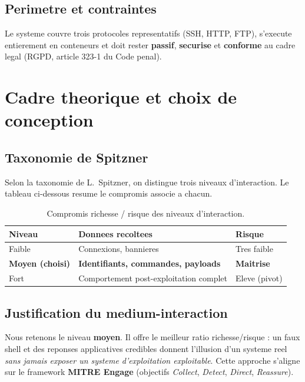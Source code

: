 \documentclass[11pt,a4paper]{article}
\begin{document}
\subsection{Perimetre et contraintes}
Le systeme couvre trois protocoles representatifs (SSH, HTTP, FTP), s'execute
entierement en conteneurs et doit rester \textbf{passif}, \textbf{securise} et
\textbf{conforme} au cadre legal (RGPD, article 323-1 du Code penal).

\section{Cadre theorique et choix de conception}
\subsection{Taxonomie de Spitzner}
Selon la taxonomie de L.~Spitzner, on distingue trois niveaux d'interaction. Le tableau
ci-dessous resume le compromis associe a chacun.

\begin{table}[h]\centering\small
\renewcommand{\arraystretch}{1.2}
\begin{tabular}{@{}lll@{}}
\toprule
\rowcolor{primary!8}\textbf{Niveau} & \textbf{Donnees recoltees} & \textbf{Risque} \\
\midrule
Faible & Connexions, bannieres & Tres faible \\
\textbf{Moyen (choisi)} & \textbf{Identifiants, commandes, payloads} & \textbf{Maitrise} \\
Fort & Comportement post-exploitation complet & Eleve (pivot) \\
\bottomrule
\end{tabular}
\caption{Compromis richesse / risque des niveaux d'interaction.}
\end{table}

\subsection{Justification du medium-interaction}
Nous retenons le niveau \textbf{moyen}. Il offre le meilleur ratio richesse/risque : un
faux shell et des reponses applicatives credibles donnent l'illusion d'un systeme reel
\emph{sans jamais exposer un systeme d'exploitation exploitable}. Cette approche
s'aligne sur le framework \textbf{MITRE Engage} (objectifs \textit{Collect},
\textit{Detect}, \textit{Direct}, \textit{Reassure}).
\end{document}
